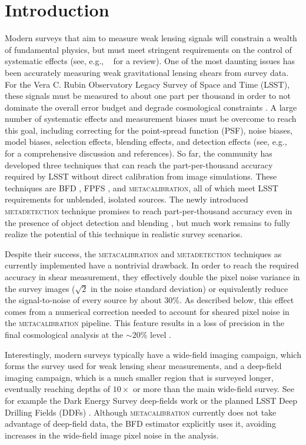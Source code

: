 \documentclass[twocolumn]{openjournal}
\makeatletter
\newcommand{\mdet}{\textsc{metadetection}\@\xspace}
\newcommand{\mcal}{\textsc{metacalibration}\@\xspace}
\makeatother
\begin{document}
\section{Introduction}\label{sec:intro}

Modern surveys that aim to measure weak lensing signals will constrain a wealth of
fundamental physics, but must meet stringent requirements on the control of systematic
effects (see, e.g., \citeauthor{MandelbaumReview}~\citeyear{MandelbaumReview} for a
review). One of the most daunting issues has been accurately measuring weak
gravitational lensing shears from survey data. For the Vera C. Rubin Observatory Legacy
Survey of Space and Time (LSST), these signals must be measured to about one part per
thousand in order to not dominate the overall error budget and degrade cosmological
constraints \citep{huterer2006,descsrd}. A large number of systematic effects and
measurement biases must be overcome to reach this goal, including correcting for the
point-spread function (PSF), noise biases, model biases, selection effects, blending
effects, and detection effects (see, e.g.,
\citeauthor{MandelbaumReview}~\citeyear{MandelbaumReview} for a comprehensive discussion
and references). So far, the community has developed three techniques
that can reach the part-per-thousand accuracy required by LSST without direct
calibration from image simulations. These techniques are BFD \citep{BernBFD2016,ba14},
FPFS \citep{li2018fpfs,li2022fpfs}, and \mcal \citep{SheldonMcal2017,HuffMcal2017},
all of which meet LSST requirements for unblended, isolated sources. The newly
introduced \mdet technique promises to reach part-per-thousand accuracy even in the
presence of object detection and blending \citep{SheldonMdet2022}, but much work
remains to fully realize the potential of this technique in realistic survey scenarios.

Despite their success, the \mcal and \mdet techniques as currently implemented
have a nontrivial drawback. In order to reach the required accuracy in shear
measurement, they effectively double the pixel noise variance in the survey images
($\sqrt{2}$ in the noise standard deviation)
or equivalently reduce the signal-to-noise of every source by
about 30\%. As described below, this
effect comes from a numerical correction needed to account for sheared pixel
noise in the \mcal pipeline. This feature results in a loss of precision in the
final cosmological analysis at the $\sim 20\%$ level \citep{SheldonMcal2017}.

Interestingly, modern surveys typically have a wide-field imaging campaign, which forms
the survey used for weak lensing shear measurements, and a deep-field imaging campaign,
which is a much smaller region that is surveyed longer, eventually reaching depths of
$10\times$ or more than the main wide-field survey. See for example the Dark Energy
Survey deep-fields work \citep{DESDeepFields} or the planned LSST Deep Drilling Fields
(DDFs) \citep{lsst-ddf-design,lsst-ddf-depth,ivezic2019lsst}. Although \mcal currently
does not take advantage of deep-field data, the BFD estimator explicitly uses it,
avoiding increases in the wide-field image pixel noise in the analysis.
\end{document}
